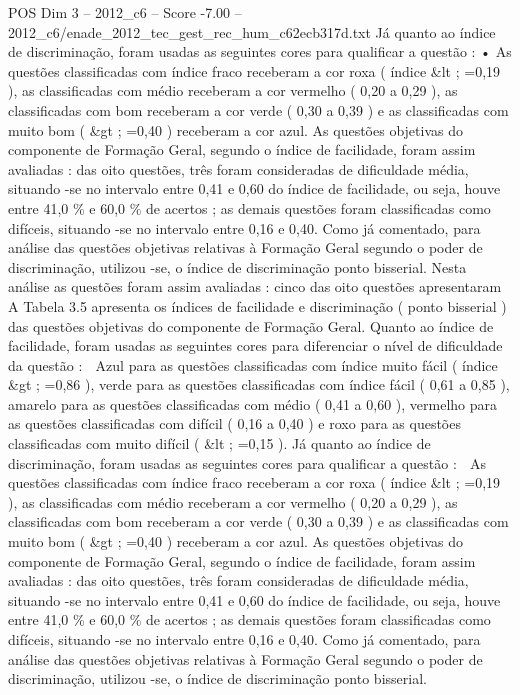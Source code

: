 \begin{textsample}{POS Dim 3 – 2012\_c6 – Score -7.00 – 2012\_c6/enade\_2012\_tec\_gest\_rec\_hum\_c62ecb317d.txt}
Já quanto ao índice de discriminação, foram usadas as seguintes cores para qualificar a questão : • As questões classificadas com índice fraco receberam a cor roxa ( índice \&lt ; =0,19 ), as classificadas com médio receberam a cor vermelho ( 0,20 a 0,29 ), as classificadas com bom receberam a cor verde ( 0,30 a 0,39 ) e as classificadas com muito bom ( \&gt ; =0,40 ) receberam a cor azul.
As questões objetivas do componente de Formação Geral, segundo o índice de facilidade, foram assim avaliadas : das oito questões, três foram consideradas de dificuldade média, situando -se no intervalo entre 0,41 e 0,60 do índice de facilidade, ou seja, houve entre 41,0 \% e 60,0 \% de acertos ; as demais questões foram classificadas como difíceis, situando -se no intervalo entre 0,16 e 0,40.
Como já comentado, para análise das questões objetivas relativas à Formação Geral segundo o poder de discriminação, utilizou -se, o índice de discriminação ponto bisserial.
Nesta análise as questões foram assim avaliadas : cinco das oito questões apresentaram A Tabela 3.5 apresenta os índices de facilidade e discriminação ( ponto bisserial ) das questões objetivas do componente de Formação Geral.
Quanto ao índice de facilidade, foram usadas as seguintes cores para diferenciar o nível de dificuldade da questão :  Azul para as questões classificadas com índice muito fácil ( índice \&gt ; =0,86 ), verde para as questões classificadas com índice fácil ( 0,61 a 0,85 ), amarelo para as questões classificadas com médio ( 0,41 a 0,60 ), vermelho para as questões classificadas com difícil ( 0,16 a 0,40 ) e roxo para as questões classificadas com muito difícil ( \&lt ; =0,15 ).
Já quanto ao índice de discriminação, foram usadas as seguintes cores para qualificar a questão :  As questões classificadas com índice fraco receberam a cor roxa ( índice \&lt ; =0,19 ), as classificadas com médio receberam a cor vermelho ( 0,20 a 0,29 ), as classificadas com bom receberam a cor verde ( 0,30 a 0,39 ) e as classificadas com muito bom ( \&gt ; =0,40 ) receberam a cor azul.
As questões objetivas do componente de Formação Geral, segundo o índice de facilidade, foram assim avaliadas : das oito questões, três foram consideradas de dificuldade média, situando -se no intervalo entre 0,41 e 0,60 do índice de facilidade, ou seja, houve entre 41,0 \% e 60,0 \% de acertos ; as demais questões foram classificadas como difíceis, situando -se no intervalo entre 0,16 e 0,40.
Como já comentado, para análise das questões objetivas relativas à Formação Geral segundo o poder de discriminação, utilizou -se, o índice de discriminação ponto bisserial.

\end{textsample}
